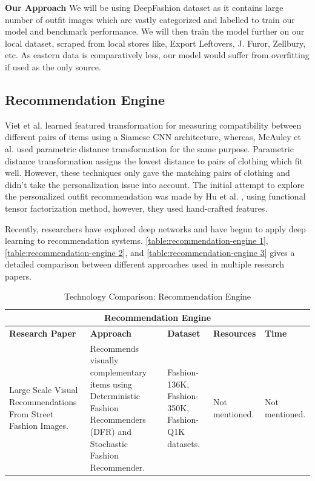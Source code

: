 \noindent\textbf{Our Approach} \newline
We will be using DeepFashion dataset as it contains large number of outfit images which are vastly categorized and labelled to train our model and benchmark performance. We will then train the model further on our local dataset, scraped from local stores like, Export Leftovers, J. Furor, Zellbury, etc. As eastern data is comparatively less, our model would suffer from overfitting if used as the only source. 

\subsection{Recommendation Engine}


Viet et al. \cite{paper4} learned featured transformation for measuring compatibility between different pairs of items using a Siamese CNN architecture, whereas, McAuley et al.\cite{paper5} used parametric distance transformation for the same purpose. Parametric distance transformation assigns the lowest distance to pairs of clothing which fit well. However, these techniques only gave the matching pairs of clothing and didn’t take the personalization issue into account. The initial attempt to explore the personalized outfit recommendation was made by Hu et al. \cite{paperseven}, using functional tensor factorization method, however, they used hand-crafted features.  \newline

Recently, researchers have explored deep networks and have begun to apply deep learning to recommendation systems. \autoref{table:recommendation-engine 1}, \autoref{table:recommendation-engine 2}, and \autoref{table:recommendation-engine 3} gives a detailed comparison between different approaches used in multiple research papers. \newline

\begin{table}[H]
\begin{tabular}{ @{}|p{3cm}|p{4cm}|p{2.5cm}|p{2.5cm}|p{2.5cm}|  }
 \hline
 \multicolumn{5}{|c|}{\textbf{Recommendation Engine}} \\
 \hline
 \textbf{Research Paper} & \textbf{Approach} & \textbf{Dataset} & \textbf{Resources} & \textbf{Time}\\
 \hline
Large Scale Visual Recommendations From Street Fashion Images.
  & Recommends visually complementary items using Deterministic Fashion Recommenders (DFR) and Stochastic Fashion Recommender.
    & Fashion-136K, Fashion-350K, Fashion-Q1K datasets. & Not mentioned. & Not mentioned.\\
\hline
\end{tabular}
\caption{Technology Comparison: Recommendation Engine}
\label{table:recommendation-engine 1}
\end{table}


